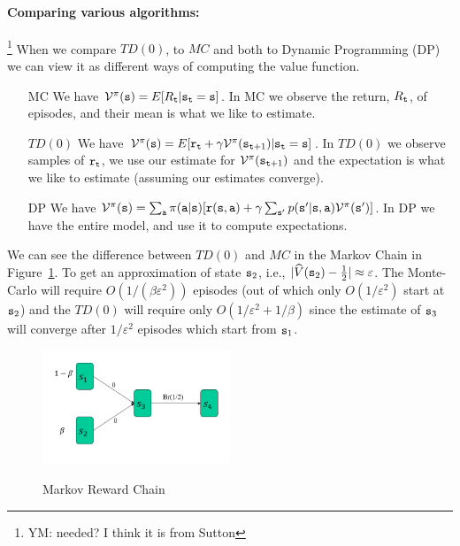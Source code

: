 \paragraph{Comparing various algorithms:}\footnote{YM: needed? I think it is from Sutton}
When we compare $TD(0)$, to $MC$ and both to  Dynamic Programming
(DP) we can view it as different ways of computing the value
function.
\begin{itemize}
\item[MC] We have $\mathcal{V}^\pi({\tt s})=E[R_{\tt t}|{\tt s}_{\tt t}={\tt s}]$. In MC we observe the
return, $R_{\tt t}$, of episodes, and their mean is what we like to
estimate.
\item [$TD(0)$]  We have $\mathcal{V}^\pi({\tt s})=E[{\tt r}_{\tt t}+\gamma \mathcal{V}^\pi({\tt s}_{{\tt t}+1})|{\tt s}_{\tt t}={\tt s}]$. In $TD(0)$ we observe samples of
${\tt r}_{\tt t}$, we use our estimate for
$\mathcal{V}^\pi({\tt s}_{{\tt t}+1})$ and the expectation is what we
like to estimate (assuming our estimates converge).
\item
[DP]
 We have $\mathcal{V}^\pi({\tt s})=\sum_{{\tt a}}\pi({\tt a}|{\tt s})[{\tt r}({\tt s},{\tt a})+\gamma \sum_{{\tt s}'}p({\tt s}'|{\tt s},{\tt a})\mathcal{V}^\pi({\tt s}')]$. In DP we
 have the entire model, and use it to compute expectations.
\end{itemize}

We can see the difference between $TD(0)$ and $MC$ in the Markov
Chain in Figure~\ref{fig:L7-TD-MC}. To get an approximation of state
${\tt s}_2$, i.e., $|\widehat{V}({\tt s}_2)-\frac{1}{2}|\approx
\varepsilon$. The Monte-Carlo will require $O(1/(\beta
\varepsilon^2))$ episodes (out of which only $O(1/\varepsilon^2)$
start at ${\tt s}_2$) and the $TD(0)$ will require only
$O(1/\varepsilon^2+1/\beta)$ since the estimate of ${\tt s}_3$ will
converge after $1/\varepsilon^2$ episodes which start from
${\tt s}_1$.

\begin{figure}
  \begin{centering}
  \includegraphics[width=0.5\textwidth]{figures/L7-TD-MC}\\
  \caption{Markov Reward Chain}\label{fig:L7-TD-MC}
  \end{centering}
\end{figure}


